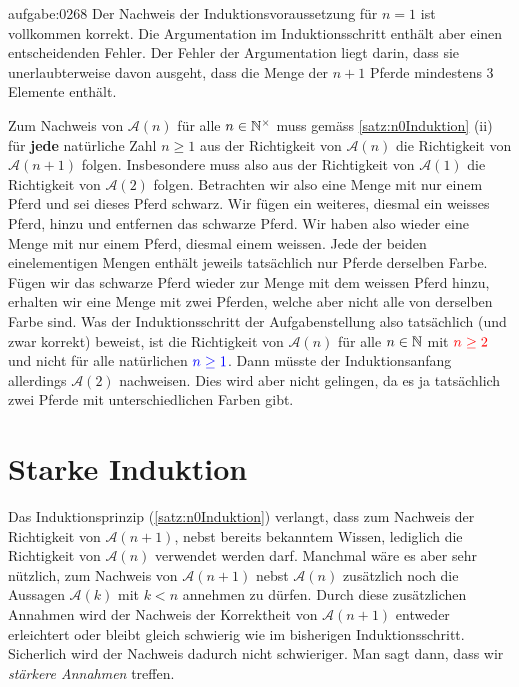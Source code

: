 \begin{antwort}{aufgabe:0268}
    Der Nachweis der Induktionsvoraussetzung für $n=1$ ist vollkommen korrekt. Die Argumentation im Induktionsschritt enthält aber einen entscheidenden Fehler. Der Fehler der Argumentation liegt darin, dass sie unerlaubterweise davon ausgeht, dass die Menge der $n+1$ Pferde mindestens 3 Elemente enthält.
    
    Zum Nachweis von $\mathcal{A}(n)$ für alle $n\in\mathbb{N}^{\times}$ muss gemäss \cref{satz:n0Induktion} (ii) für \textbf{jede} natürliche Zahl $n\geq 1$ aus der Richtigkeit von $\mathcal{A}(n)$ die Richtigkeit von $\mathcal{A}(n+1)$ folgen. Insbesondere muss also aus der Richtigkeit von $\mathcal{A}(1)$ die Richtigkeit von $\mathcal{A}(2)$ folgen. Betrachten wir also eine Menge mit nur einem Pferd und sei dieses Pferd schwarz. Wir fügen ein weiteres, diesmal ein weisses Pferd, hinzu und entfernen das schwarze Pferd. Wir haben also wieder eine Menge mit nur einem Pferd, diesmal einem weissen. Jede der beiden einelementigen Mengen enthält jeweils tatsächlich nur Pferde derselben Farbe. Fügen wir das schwarze Pferd wieder zur Menge mit dem weissen Pferd hinzu, erhalten wir eine Menge mit zwei Pferden, welche aber nicht alle von derselben Farbe sind. Was der Induktionsschritt der Aufgabenstellung also tatsächlich (und zwar korrekt) beweist, ist die Richtigkeit von $\mathcal{A}(n)$ für alle $n\in\mathbb{N}$ mit $\textcolor{Red}{n\geq 2}$ und nicht für alle natürlichen $\textcolor{Blue}{n\geq 1}$. Dann müsste der Induktionsanfang allerdings $\mathcal{A}(2)$ nachweisen. Dies wird aber nicht gelingen, da es ja tatsächlich zwei Pferde mit unterschiedlichen Farben gibt. \cite{Piotr}
\end{antwort}


\section{Starke Induktion}
Das Induktionsprinzip (\cref{satz:n0Induktion}) verlangt, dass zum Nachweis der Richtigkeit von $\mathcal{A}(n+1)$, nebst bereits bekanntem Wissen, lediglich die Richtigkeit von $\mathcal{A}(n)$ verwendet werden darf. Manchmal wäre es aber sehr nützlich, zum Nachweis von $\mathcal{A}(n+1)$ nebst $\mathcal{A}(n)$ zusätzlich noch die Aussagen $\mathcal{A}(k)$ mit $k<n$ annehmen zu dürfen. Durch diese zusätzlichen Annahmen wird der Nachweis der Korrektheit von $\mathcal{A}(n+1)$ entweder erleichtert oder bleibt gleich schwierig wie im bisherigen Induktionsschritt. Sicherlich wird der Nachweis dadurch nicht schwieriger. Man sagt dann, dass wir \textit{stärkere Annahmen} treffen.

